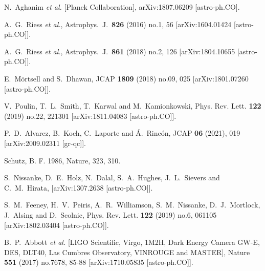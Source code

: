 \documentclass[aps,prd,amsmath,amssymb]{revtex4}
\begin{document}
\begin{thebibliography}{99}
 N.~Aghanim {\it et al.} [Planck Collaboration],
  arXiv:1807.06209 [astro-ph.CO].
  
 A.~G.~Riess {\it et al.},
  Astrophys.\ J.\  {\bf 826} (2016) no.1,  56
  [arXiv:1604.01424 [astro-ph.CO]].
  
 A.~G.~Riess {\it et al.},
  Astrophys.\ J.\  {\bf 861} (2018) no.2,  126
  [arXiv:1804.10655 [astro-ph.CO]].  

 E.~M{\"o}rtsell and S.~Dhawan,
  JCAP {\bf 1809} (2018) no.09,  025
  [arXiv:1801.07260 [astro-ph.CO]].
  
 V.~Poulin, T.~L.~Smith, T.~Karwal and M.~Kamionkowski,
Phys. Rev. Lett. \textbf{122} (2019) no.22, 221301
[arXiv:1811.04083 [astro-ph.CO]].
  
 P.~D.~Alvarez, B.~Koch, C.~Laporte and \'A.~Rinc\'on,
JCAP \textbf{06} (2021), 019
[arXiv:2009.02311 [gr-qc]].  
  
 Schutz, B. F. 1986, Nature, 323, 310.  

 S.~Nissanke, D.~E.~Holz, N.~Dalal, S.~A.~Hughes, J.~L.~Sievers and C.~M.~Hirata,
[arXiv:1307.2638 [astro-ph.CO]].

 S.~M.~Feeney, H.~V.~Peiris, A.~R.~Williamson, S.~M.~Nissanke, D.~J.~Mortlock, J.~Alsing and D.~Scolnic,
Phys. Rev. Lett. \textbf{122} (2019) no.6, 061105
[arXiv:1802.03404 [astro-ph.CO]].

 B.~P.~Abbott \textit{et al.} [LIGO Scientific, Virgo, 1M2H, Dark Energy Camera GW-E, DES, DLT40, Las Cumbres Observatory, VINROUGE and MASTER],
Nature \textbf{551} (2017) no.7678, 85-88
[arXiv:1710.05835 [astro-ph.CO]].
  

\end{thebibliography}
\end{document}
